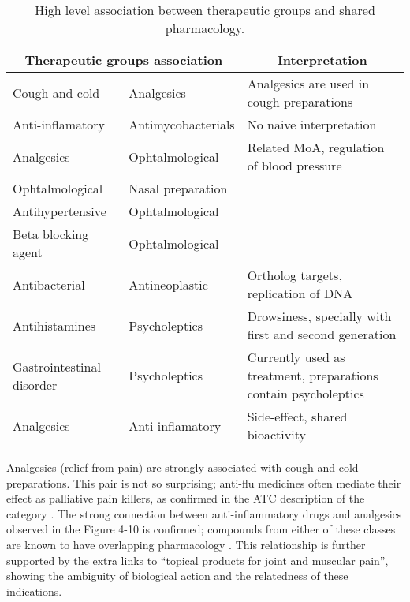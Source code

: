 \begin{table}[htbp]
\begin{tabular}{|l|l|p{5cm}|}
\hline
\multicolumn{2}{|c|}{\textbf{Therapeutic groups association}} & \multicolumn{1}{c|}{\textbf{Interpretation}} \\ \hline
Cough and cold & Analgesics & Analgesics are used in cough preparations \citep{atcr05} \\ \hline
Anti-inflamatory & Antimycobacterials & No naive interpretation \\ \hline
Analgesics & Ophtalmological & \multicolumn{ 1}{l|}{Related MoA, regulation of blood pressure} \\ \cline{ 1- 2}
Ophtalmological & Nasal preparation & \multicolumn{ 1}{l|}{} \\ \cline{ 1- 2}
Antihypertensive & Ophtalmological & \multicolumn{ 1}{l|}{} \\ \cline{ 1- 2}
Beta blocking agent & Ophtalmological & \multicolumn{ 1}{l|}{} \\ \hline
Antibacterial & Antineoplastic & Ortholog targets, replication of DNA \\ \hline
Antihistamines & Psycholeptics & Drowsiness, specially with first and second generation \citep{gengo1987antihistamines} \\ \hline
Gastrointestinal disorder & Psycholeptics & Currently used as treatment, preparations contain psycholeptics \citep{atca03} \\ \hline
Analgesics & Anti-inflamatory & Side-effect, shared bioactivity \citep{hunskaar1987formalin} \\ \hline
\end{tabular}
\caption{High level association between therapeutic groups and shared pharmacology.}
\label{higlevelhypo}
\end{table}

Analgesics (relief from pain) are strongly associated with cough and cold preparations. This pair is not so surprising; anti-flu medicines often mediate their effect as palliative pain killers, as confirmed in the ATC description of the category \citep{atcr05}. The strong connection between anti-inflammatory drugs and analgesics observed in the Figure 4-10 is confirmed; compounds from either of these classes are known to have overlapping pharmacology \citep{hunskaar1987formalin}. This relationship is further supported by the extra links to “topical products for joint and muscular pain”, showing the ambiguity of biological action and the relatedness of these indications.

